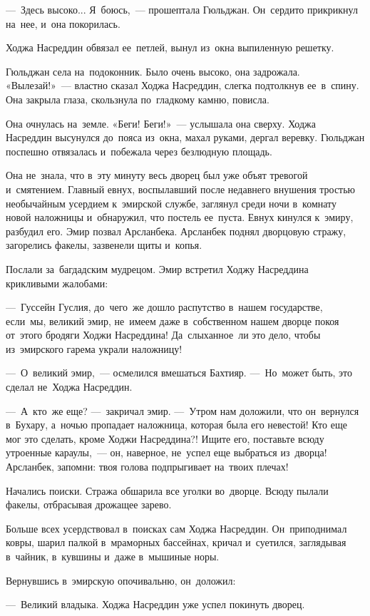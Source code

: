 \documentclass[12pt,a4paper]{book}
\begin{document}
—~Здесь высоко... Я~боюсь,~— прошептала Гюльджан. Он~сердито прикрикнул на~нее, и~она покорилась.

Ходжа Насреддин обвязал ее~петлей, вынул из~окна выпиленную решетку.

Гюльджан села на~подоконник. Было очень высоко, она задрожала. «Вылезай!»~— властно сказал Ходжа Насреддин, слегка подтолкнув ее~в~спину. Она закрыла глаза, скользнула по~гладкому камню, повисла.

Она очнулась на~земле. «Беги! Беги!»~— услышала она сверху. Ходжа Насреддин высунулся до~пояса из~окна, махал руками, дергал веревку. Гюльджан поспешно отвязалась и~побежала через безлюдную площадь.

Она не~знала, что в~эту минуту весь дворец был уже объят тревогой и~смятением. Главный евнух, воспылавший после недавнего внушения тростью необычайным усердием к~эмирской службе, заглянул среди ночи в~комнату новой наложницы и~обнаружил, что постель ее~пуста. Евнух кинулся к~эмиру, разбудил его. Эмир позвал Арсланбека. Арсланбек поднял дворцовую стражу, загорелись факелы, зазвенели щиты и~копья.

Послали за~багдадским мудрецом. Эмир встретил Ходжу Насреддина крикливыми жалобами:

—~Гуссейн Гуслия, до~чего~же дошло распутство в~нашем государстве, если~мы, великий эмир, не~имеем даже в~собственном нашем дворце покоя от~этого бродяги Ходжи Насреддина! Да~слыханное~ли это дело, чтобы из~эмирского гарема украли наложницу!

—~О~великий эмир,~— осмелился вмешаться Бахтияр. —~Но~может быть, это сделал не~Ходжа Насреддин.

—~А~кто~же еще? —~закричал эмир. —~Утром нам доложили, что он~вернулся в~Бухару, а~ночью пропадает наложница, которая была его невестой! Кто еще мог это сделать, кроме Ходжи Насреддина?! Ищите его, поставьте всюду утроенные караулы,~— он, наверное, не~успел еще выбраться из~дворца! Арсланбек, запомни: твоя голова подпрыгивает на~твоих плечах!

Начались поиски. Стража обшарила все уголки во~дворце. Всюду пылали факелы, отбрасывая дрожащее зарево.

Больше всех усердствовал в~поисках сам Ходжа Насреддин. Он~приподнимал ковры, шарил палкой в~мраморных бассейнах, кричал и~суетился, заглядывая в~чайник, в~кувшины и~даже в~мышиные норы.

Вернувшись в~эмирскую опочивальню, он~доложил:

—~Великий владыка. Ходжа Насреддин уже успел покинуть дворец.
\end{document}
